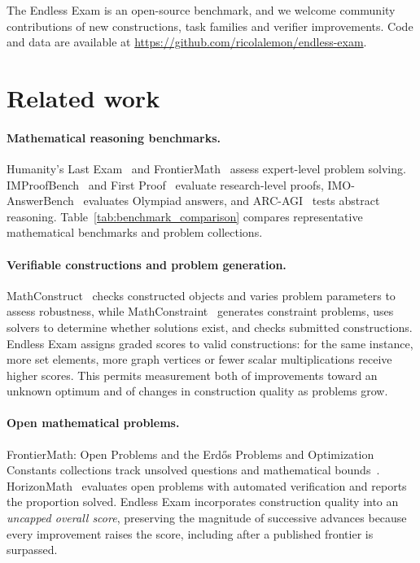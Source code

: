 \documentclass{article}
\begin{document}
The Endless Exam is an open-source benchmark, and we welcome community contributions of new constructions, task families and verifier improvements.
\ifdefined\EndlessExamPreprint
Code and data are available at \mbox{\url{https://github.com/ricolalemon/endless-exam}}.
\fi

\section{Related work}
\label{sec:related}

\paragraph{Mathematical reasoning benchmarks.}
Humanity's Last Exam~\citep{phan2025hle} and FrontierMath~\citep{glazer2024frontiermath,epoch2026frontiermath} assess expert-level problem solving. IMProofBench~\citep{schmitt2025improofbench} and First Proof~\citep{abouzaid2026firstproof} evaluate research-level proofs, IMO-AnswerBench~\citep{luong2025imobench} evaluates Olympiad answers, and ARC-AGI~\citep{chollet2019arc,chollet2025arcagi2} tests abstract reasoning. Table~\ref{tab:benchmark_comparison} compares representative mathematical benchmarks and problem collections.

\paragraph{Verifiable constructions and problem generation.}
MathConstruct~\citep{balunovic2025mathconstruct} checks constructed objects and varies problem parameters to assess robustness, while MathConstraint~\citep{pati2026mathconstraint} generates constraint problems, uses solvers to determine whether solutions exist, and checks submitted constructions. Endless Exam assigns graded scores to valid constructions: for the same instance, more set elements, more graph vertices or fewer scalar multiplications receive higher scores. This permits measurement both of improvements toward an unknown optimum and of changes in construction quality as problems grow.

\pagebreak
\paragraph{Open mathematical problems.}
FrontierMath: Open Problems and the Erd\H{o}s Problems and Optimization Constants collections track unsolved questions and mathematical bounds~\citep{epoch2026openproblems,bloom2021erdosproblems,davis2026constants}. HorizonMath~\citep{horizonmath2026} evaluates open problems with automated verification and reports the proportion solved. Endless Exam incorporates construction quality into an \emph{uncapped overall score}, preserving the magnitude of successive advances because every improvement raises the score, including after a published frontier is surpassed.
\end{document}
